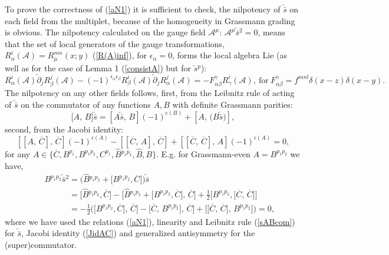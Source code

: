 \documentclass[10pt]{article}
\begin{document}
\noindent
To prove the correctness of (\ref{aN1}) it is sufficient to   check,  the nilpotency of  $\overleftarrow{\bar{s}}$  on each field from the multiplet, because of the homogeneity in Grassmann grading is obvious.  The nilpotency calculated on the gauge field $\mathcal{A}^\mu$: $\mathcal{A}^\mu  \overleftarrow{\bar{s}}{}^2 =0$,  means that the set of local generators of the gauge transformations, $R^i_\alpha(\mathcal{A}) = R_{\mu
}^{mn}(x;y)$ (\ref{R(A)inf}), for $\epsilon_{\alpha}=0$,  forms  the local algebra Lie (as well as for the case of Lemma 1 (\ref{consistA}) but for $\overleftarrow{s}{}^p$):
\begin{equation}\label{clalg}
  R^i_\alpha(\mathcal{A})\overleftarrow{\partial}_jR^j_\beta(\mathcal{A})-(-1)^{\epsilon_{\alpha}\epsilon_{\beta}}R^i_\beta(\mathcal{A})\overleftarrow{\partial}_jR^j_\alpha(\mathcal{A})= - F^\gamma_{\alpha\beta} R^i_\gamma(\mathcal{A}), \ \mathrm{for} \ F^\gamma_{\alpha\beta} =f^{mnl}\delta(x-z)\delta(x-y) .
\end{equation}
The nilpotency on any other fields follows,  first, from the Leibnitz rule of acting of $\overleftarrow{\bar{s}}$ on the commutator of any functions $A, B$ with definite Grassmann parities:
\begin{equation}  \big[  A,\,B\big]\overleftarrow{\bar{s}}  =\left[ A\overleftarrow{\bar{s}},\,  B\right](  -1)^{\epsilon(B)}+\left[A,\,  \big(B\overleftarrow{\bar{s}}\big)\right],\label{sABcom}
\end{equation}
 second,  from the Jacobi identity:
\begin{equation}  \left[ \left[ A,\, \overline{C}\right],\,\overline{C}\right] (-1)^{\epsilon(A)} - \left[ \left[ \overline{C},\,A\right],\,\overline{C}\right]+ \left[ \left[ \overline{C},\, \overline{C}\right],\,A\right] (-1)^{\epsilon(A)}    =0,\label{JidAC}
\end{equation}
  for any $A \in \big\{\overline{C}, B^{p_1}, B^{p_1p_2}, C^{p_1}, \widehat{B}{}^{p_1p_2}, \widehat{B}, B\big\}$.  E.g. for Grassmann-even  $A = B^{p_1p_2}$ we have,
\begin{eqnarray}
&& B^{p_1p_2}\overleftarrow{\bar{s}}{}^2  = \big(\widehat{B}{}^{p_1p_2}+ \big[B^{p_1p_2}, \overline{C}\big]\big)\overleftarrow{\bar{s}}  \nonumber\\
&&  \phantom{ B^{p_1p_2}\overleftarrow{\bar{s}}{}^2}
= \big[\widehat{B}{}^{p_1p_2}, \overline{C}\big]  - \big[\widehat{B}{}^{p_1p_2}+ \big[B^{p_1p_2}, \overline{C}\big],\, \overline{C}\big] + \textstyle\frac{1}{2}\big[B^{p_1p_2}, \big[\overline{C},\,\overline{C}\big]\big] \nonumber \\
&& \phantom{ B^{p_1p_2}\overleftarrow{\bar{s}}{}^2} = - \frac{1}{2}\Big(\big[B^{p_1p_2}, \overline{C}\big],\, \overline{C}\big] - \big[\overline{C},\,B^{p_1p_2} \big],\, \overline{C}\big] + \big[\big[\overline{C},\,\overline{C}\big],\,B^{p_1p_2} \big] \Big) =0,
\label{Jidex}
\end{eqnarray}
 where we have used the relations (\ref{aN1}), linearity and Leibnitz rule (\ref{sABcom}) for $\overleftarrow{\bar{s}}$, Jacobi identity (\ref{JidAC}) and generalized antisymmetry for the (super)commutator.
\end{document}
